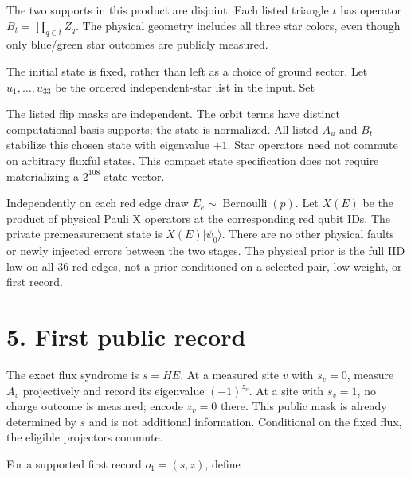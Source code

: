 \documentclass[11pt,letterpaper]{article}
\newcommand{\displayfit}[1]{\sbox{\mathbox}{$\displaystyle #1$}\ifdim\wd\mathbox>\linewidth\resizebox{\linewidth}{!}{\usebox{\mathbox}}\else\usebox{\mathbox}\fi}
\begin{document}
The two supports in this product are disjoint. Each listed triangle $t$ has operator $B_t=\prod_{q\in t}Z_q$. The physical geometry includes all three star colors, even though only blue/green star outcomes are publicly measured.\par

The initial state is fixed, rather than left as a choice of ground sector. Let $u_1,\ldots,u_{33}$ be the ordered independent-star list in the input. Set\par

\begin{center}\displayfit{|\psi_0\rangle=2^{-33/2}\sum_{b\in\{0,1\}^{33}} A_{u_1}^{b_1}\cdots A_{u_{33}}^{b_{33}}|0\rangle^{\otimes108}.}\end{center}

The listed flip masks are independent. The orbit terms have distinct computational-basis supports; the state is normalized. All listed $A_u$ and $B_t$ stabilize this chosen state with eigenvalue $+1$. Star operators need not commute on arbitrary fluxful states. This compact state specification does not require materializing a $2^{108}$ state vector.\par

Independently on each red edge draw $E_e\sim\operatorname{Bernoulli}(p)$. Let $X(E)$ be the product of physical Pauli X operators at the corresponding red qubit IDs. The private premeasurement state is $X(E)|\psi_0\rangle$. There are no other physical faults or newly injected errors between the two stages. The physical prior is the full IID law on all 36 red edges, not a prior conditioned on a selected pair, low weight, or first record.\par

\section*{5. First public record}

The exact flux syndrome is $s=HE$. At a measured site $v$ with $s_v=0$, measure $A_v$ projectively and record its eigenvalue $(-1)^{z_v}$. At a site with $s_v=1$, no charge outcome is measured; encode $z_v=0$ there. This public mask is already determined by $s$ and is not additional information. Conditional on the fixed flux, the eligible projectors commute.\par


For a supported first record $o_1=(s,z)$, define\par
\end{document}
